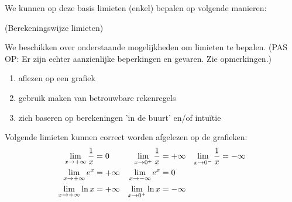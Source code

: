 \documentclass{ximera}
\begin{document}


We kunnen op deze basis limieten (enkel) bepalen op volgende manieren:

\begin{proposition} (Berekeningswijze limieten)
	
We beschikken over onderstaande mogelijkheden om limieten te bepalen. (PAS OP: Er zijn echter aanzienlijke beperkingen en gevaren. Zie opmerkingen.)
\begin{enumerate}
	\item aflezen op een grafiek  
	\item gebruik maken van betrouwbare rekenregels 
	\item zich baseren op berekeningen 'in de buurt' en/of intuïtie 

\end{enumerate}

Volgende limieten kunnen correct worden afgelezen op de grafieken:
\begin{align*}
\limxi \frac 1x & = 0 &
\rlimx \frac 1x & = +\infty &
\llimx \frac 1x & = -\infty \\
\limxi  e^x & = +\infty &
\limxmi e^x & = 0 \\
\limxi  \ln x & = +\infty &
\rlimx  \ln x & = -\infty
\end{align*}
\end{proposition}
\end{document}
